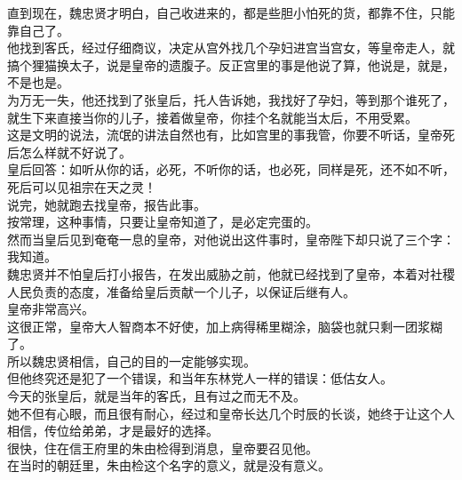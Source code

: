 \begin{multicols}{\theparacolNo}
直到现在，魏忠贤才明白，自己收进来的，都是些胆小怕死的货，都靠不住，只能靠自己了。\\

他找到客氏，经过仔细商议，决定从宫外找几个孕妇进宫当宫女，等皇帝走人，就搞个狸猫换太子，说是皇帝的遗腹子。反正宫里的事是他说了算，他说是，就是，不是也是。\\

为万无一失，他还找到了张皇后，托人告诉她，我找好了孕妇，等到那个谁死了，就生下来直接当你的儿子，接着做皇帝，你挂个名就能当太后，不用受累。\\

这是文明的说法，流氓的讲法自然也有，比如宫里的事我管，你要不听话，皇帝死后怎么样就不好说了。\\

皇后回答：如听从你的话，必死，不听你的话，也必死，同样是死，还不如不听，死后可以见祖宗在天之灵！\\

说完，她就跑去找皇帝，报告此事。\\

按常理，这种事情，只要让皇帝知道了，是必定完蛋的。\\

然而当皇后见到奄奄一息的皇帝，对他说出这件事时，皇帝陛下却只说了三个字：我知道。\\

魏忠贤并不怕皇后打小报告，在发出威胁之前，他就已经找到了皇帝，本着对社稷人民负责的态度，准备给皇后贡献一个儿子，以保证后继有人。\\

皇帝非常高兴。\\

这很正常，皇帝大人智商本不好使，加上病得稀里糊涂，脑袋也就只剩一团浆糊了。\\

所以魏忠贤相信，自己的目的一定能够实现。\\

但他终究还是犯了一个错误，和当年东林党人一样的错误：低估女人。\\

今天的张皇后，就是当年的客氏，且有过之而无不及。\\

她不但有心眼，而且很有耐心，经过和皇帝长达几个时辰的长谈，她终于让这个人相信，传位给弟弟，才是最好的选择。\\

很快，住在信王府里的朱由检得到消息，皇帝要召见他。\\

在当时的朝廷里，朱由检这个名字的意义，就是没有意义。\\


\end{multicols}
